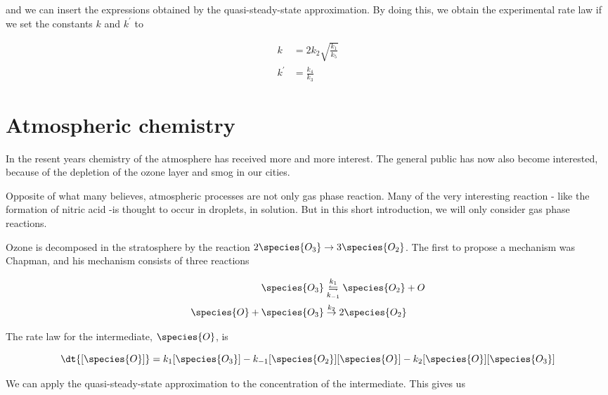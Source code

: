 and we can insert the expressions obtained by the quasi-steady-state approximation. By doing this, we obtain the experimental rate law if we set the constants $k$ and $k^\prime$ to

\begin{subequations}
    \begin{align}
        k        &= 2k_2\sqrt{\frac{k_1}{k_5}}   \\
        k^\prime &= \frac{k_4}{k_3}
    \end{align}
\end{subequations}

\section{Atmospheric chemistry}

In the resent years chemistry of the atmosphere has received more and more interest. The general public has now also become interested, because of the depletion of the ozone layer and smog in our cities.

Opposite of what many believes, atmospheric processes are not only gas phase reaction. Many of the very interesting reaction - like the formation of nitric acid -is thought to occur in droplets, \ie in solution. But in this short introduction, we will only consider gas phase reactions.

Ozone is decomposed in the stratosphere by the reaction $2\species{O_3} \rightarrow 3\species{O_2}$. The first to propose a mechanism was Chapman, and his mechanism consists of three reactions

\begin{subequations}
    \begin{align}
        \species{O_3}               &\overset{k_1}{\underset{k_{-1}}{\leftrightharpoons}} \species{O_2} + O \\
        \species{O} + \species{O_3} &\overset{k_2}{\rightarrow} 2\species{O_2}
    \end{align}
\end{subequations}

The rate law for the intermediate, $\species{O}$, is

\begin{equation}
    \dt{[\species{O}]} = k_1[\species{O_3}] - k_{-1}[\species{O_2}][\species{O}] - k_2[\species{O}][\species{O_3}]
\end{equation}

We can apply the quasi-steady-state approximation to the concentration of the intermediate. This gives us


